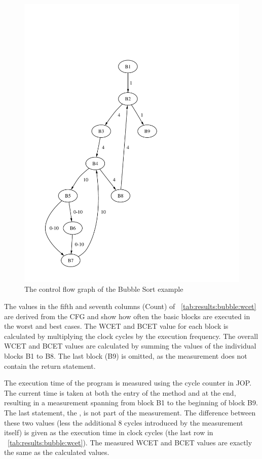 \begin{figure}
    \centering
    \includegraphics[height=\excelwidth]{results/results_wcet_cfg}
    \caption{The control flow graph of the Bubble Sort example}
    \label{fig:results:wcet:cfg}
\end{figure}


The values in the fifth and seventh columns (Count) of
\tablename~\ref{tab:results:bubble:wcet} are derived from the CFG
and show how often the basic blocks are executed in the worst and
best cases. The WCET and BCET value for each block is calculated by
multiplying the clock cycles by the execution frequency. The overall
WCET and BCET values are calculated by summing the values of the
individual blocks B1 to B8. The last block (B9) is omitted, as the
measurement does not contain the return statement.

The execution time of the program is measured using the cycle
counter in JOP. The current time is taken at both the entry of the
method and at the end, resulting in a measurement spanning from
block B1 to the beginning of block B9. The last statement, the
, is not part of the measurement. The difference
between these two values (less the additional 8 cycles introduced by
the measurement itself) is given as the execution time in clock
cycles (the last row in \tablename~\ref{tab:results:bubble:wcet}).
The measured WCET and BCET values are exactly the same as the
calculated values.

